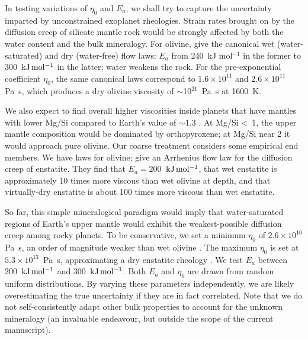 \documentclass[trackchanges]{aastex63}
\begin{document}
In testing variations of $\eta_0$ and $E_a$, we shall try to capture the uncertainty imparted by unconstrained exoplanet rheologies. Strain rates brought on by the diffusion creep of silicate mantle rock would be strongly affected by both the water content and the bulk mineralogy. For olivine, \citet{karato_rheology_1993} give the canonical wet (water-saturated) and dry (water-free) flow laws: $E_a$ from 240~kJ mol$^{-1}$ in the former to 300~$\rm{kJ\,mol^{-1}}$ in the latter; water weakens the rock. For the pre-exponential coefficient $\eta_0$, the same canonical laws correspond to $1.6 \times 10^{11}$ and $2.6 \times 10^{11}$ Pa~s, which produces a dry olivine viscosity of $\sim$10$^{21}$~Pa~s at 1600~K. %

We also expect to find overall higher viscosities inside planets that have mantles with lower Mg/Si compared to Earth's value of $\sim$1.3 \citep{pagano_chemical_2015, spaargaren_influence_2020, ballmer_diversity_2021}. At Mg/Si \textless~1, the upper mantle composition would be dominated by orthopyroxene; at Mg/Si near 2 it would approach pure olivine. Our coarse treatment considers some empirical end members. We have laws for olivine; \citet{zhang_diffusion_2017} give an Arrhenius flow law for the diffusion creep of enstatite. They find that $E_a = 200$~$\rm{kJ\,mol^{-1}}$, that wet enstatite is approximately 10 times more viscous than wet olivine at depth, and that virtually-dry enstatite is about 100 times more viscous than wet enstatite.



So far, this simple mineralogical paradigm would imply that water-saturated regions of Earth's upper mantle would exhibit the weakest-possible diffusion creep among rocky planets.
To be conservative, we set a minimum $\eta_0$ of $2.6 \times 10^{10}$ Pa~s, an order of magnitude weaker than wet olivine \citep{karato_rheology_1993}. The maximum $\eta_0$ is set at $5.3 \times 10^{13}$~Pa~s, approximating a dry enstatite rheology \citep{zhang_diffusion_2017}. We test $E_a$ between 200~$\rm{kJ\,mol^{-1}}$ and 300~$\rm{kJ\,mol^{-1}}$. Both $E_a$ and $\eta_0$ are drawn from random uniform distributions. By varying these parameters independently, we are likely overestimating the true uncertainty if they are in fact correlated. Note that we do not self-consistently adapt other bulk properties to account for the unknown mineralogy (an invaluable endeavour, but outside the scope of the current manuscript).
\end{document}
